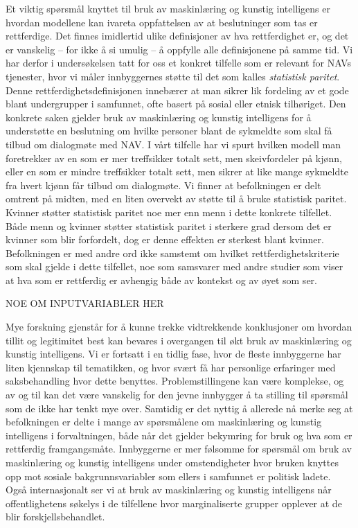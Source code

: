 \documentclass[
]{book}
\begin{document}
Et viktig spørsmål knyttet til bruk av maskinlæring og kunstig intelligens er hvordan modellene kan ivareta oppfattelsen av at beslutninger som tas er rettferdige.
Det finnes imidlertid ulike definisjoner av hva rettferdighet er, og det er vanskelig -- for ikke å si umulig -- å oppfylle alle definisjonene på samme tid.
Vi har derfor i undersøkelsen tatt for oss et konkret tilfelle som er relevant for NAVs tjenester, hvor vi måler innbyggernes støtte til det som kalles \emph{statistisk paritet}.
Denne rettferdighetsdefinisjonen innebærer at man sikrer lik fordeling av et gode blant undergrupper i samfunnet, ofte basert på sosial eller etnisk tilhøriget.
Den konkrete saken gjelder bruk av maskinlæring og kunstig intelligens for å understøtte en beslutning om hvilke personer blant de sykmeldte som skal få tilbud om dialogmøte med NAV.
I vårt tilfelle har vi spurt hvilken modell man foretrekker av en som er mer treffsikker totalt sett, men skeivfordeler på kjønn, eller en som er mindre treffsikker totalt sett, men sikrer at like mange sykmeldte fra hvert kjønn får tilbud om dialogmøte.
Vi finner at befolkningen er delt omtrent på midten, med en liten overvekt av støtte til å bruke statistisk paritet.
Kvinner støtter statistisk paritet noe mer enn menn i dette konkrete tilfellet.
Både menn og kvinner støtter statistisk paritet i sterkere grad dersom det er kvinner som blir forfordelt, dog er denne effekten er sterkest blant kvinner.
Befolkningen er med andre ord ikke samstemt om hvilket rettferdighetskriterie som skal gjelde i dette tilfellet, noe som samsvarer med andre studier som viser at hva som er rettferdig er avhengig både av kontekst og av øyet som ser.

NOE OM INPUTVARIABLER HER

Mye forskning gjenstår for å kunne trekke vidtrekkende konklusjoner om hvordan tillit og legitimitet best kan bevares i overgangen til økt bruk av maskinlæring og kunstig intelligens.
Vi er fortsatt i en tidlig fase, hvor de fleste innbyggerne har liten kjennskap til tematikken, og hvor svært få har personlige erfaringer med saksbehandling hvor dette benyttes.
Problemstillingene kan være komplekse, og av og til kan det være vanskelig for den jevne innbygger å ta stilling til spørsmål som de ikke har tenkt mye over.
Samtidig er det nyttig å allerede nå merke seg at befolkningen er delte i mange av spørsmålene om maskinlæring og kunstig intelligens i forvaltningen, både når det gjelder bekymring for bruk og hva som er rettferdig framgangsmåte.
Innbyggerne er mer følsomme for spørsmål om bruk av maskinlæring og kunstig intelligens under omstendigheter hvor bruken knyttes opp mot sosiale bakgrunnsvariabler som ellers i samfunnet er politisk ladete.
Også internasjonalt ser vi at bruk av maskinlæring og kunstig intelligens når offentlighetens søkelys i de tilfellene hvor marginaliserte grupper opplever at de blir forskjellsbehandlet.
\end{document}
